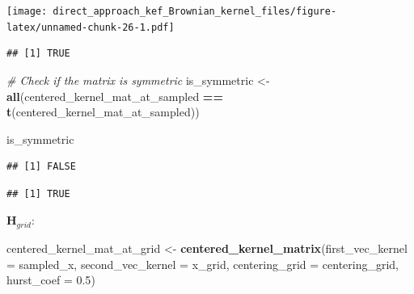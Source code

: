 \documentclass[
]{article}
\newenvironment{Shaded}{\begin{snugshade}}{\end{snugshade}}
\newcommand{\AttributeTok}[1]{\textcolor[rgb]{0.13,0.29,0.53}{#1}}
\newcommand{\CommentTok}[1]{\textcolor[rgb]{0.56,0.35,0.01}{\textit{#1}}}
\newcommand{\DecValTok}[1]{\textcolor[rgb]{0.00,0.00,0.81}{#1}}
\newcommand{\FloatTok}[1]{\textcolor[rgb]{0.00,0.00,0.81}{#1}}
\newcommand{\FunctionTok}[1]{\textcolor[rgb]{0.13,0.29,0.53}{\textbf{#1}}}
\newcommand{\NormalTok}[1]{#1}
\newcommand{\OtherTok}[1]{\textcolor[rgb]{0.56,0.35,0.01}{#1}}
\newcommand{\SpecialCharTok}[1]{\textcolor[rgb]{0.81,0.36,0.00}{\textbf{#1}}}
\begin{document}
\texttt{[image: direct\_approach\_kef\_Brownian\_kernel\_files/figure-latex/unnamed-chunk-26-1.pdf]}

\begin{Shaded}
\end{Shaded}

\begin{verbatim}
## [1] TRUE
\end{verbatim}

\begin{Shaded}
\begin{Highlighting}[]
\CommentTok{\# Check if the matrix is symmetric}
\NormalTok{is\_symmetric }\OtherTok{\textless{}{-}} \FunctionTok{all}\NormalTok{(centered\_kernel\_mat\_at\_sampled }\SpecialCharTok{==} \FunctionTok{t}\NormalTok{(centered\_kernel\_mat\_at\_sampled))}

\NormalTok{is\_symmetric}
\end{Highlighting}
\end{Shaded}

\begin{verbatim}
## [1] FALSE
\end{verbatim}

\begin{Shaded}
\end{Shaded}

\begin{verbatim}
## [1] TRUE
\end{verbatim}

\(\mathbf{H}_{grid}\):

\begin{Shaded}
\begin{Highlighting}[]
\NormalTok{centered\_kernel\_mat\_at\_grid }\OtherTok{\textless{}{-}} \FunctionTok{centered\_kernel\_matrix}\NormalTok{(}\AttributeTok{first\_vec\_kernel =}\NormalTok{ sampled\_x,}
                                                         \AttributeTok{second\_vec\_kernel =}\NormalTok{ x\_grid,}
                                                         \AttributeTok{centering\_grid =}\NormalTok{ centering\_grid,}
                                                         \AttributeTok{hurst\_coef =} \FloatTok{0.5}\NormalTok{)}
\end{Highlighting}
\end{Shaded}
\end{document}
